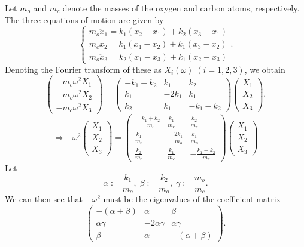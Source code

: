 \item

Let $m_o$ and $m_c$ denote the masses of the oxygen and carbon atoms, respectively.
The three equations of motion are given by
\[
    \begin{cases}
        m_o \ddot{x}_1 = k_1 \left( x_2 - x_1  \right) + k_2 \left( x_3 - x_1  \right) \\
        m_c \ddot{x}_2 = k_1 \left( x_1 - x_2  \right) + k_1 \left( x_3 - x_2  \right) \\
        m_o \ddot{x}_3 = k_2 \left( x_1 - x_3  \right) + k_1\left( x_2 - x_3  \right)
    \end{cases}.
\]
Denoting the Fourier transform of these as $X_i(\omega)\; (i = 1, 2, 3)$, we obtain
\[
    \begin{pmatrix}
        -m_c \omega^2 X_1 \\ -m_o \omega^2 X_2 \\ -m_c \omega^2 X_3
    \end{pmatrix}
    = \begin{pmatrix}
        -k_1 - k_2 & k_1   & k_2        \\
        k_1        & -2k_1 & k_1        \\
        k_2        & k_1   & -k_1 - k_2
    \end{pmatrix} \begin{pmatrix}
        X_1 \\ X_2 \\ X_3
    \end{pmatrix}.
\]
\[
    \Rightarrow -\omega^2 \begin{pmatrix}
        X_1 \\ X_2 \\ X_3
    \end{pmatrix}
    = \begin{pmatrix}
        -\frac{k_1 + k_2}{m_c} & \frac{k_1}{m_c}   & \frac{k_2}{m_c}        \\
        \frac{k_1}{m_o}        & -\frac{2k_1}{m_o} & \frac{k_1}{m_o}        \\
        \frac{k_2}{m_c}        & \frac{k_1}{m_c}   & -\frac{k_1 + k_2}{m_c}
    \end{pmatrix} \begin{pmatrix}
        X_1 \\ X_2 \\ X_3
    \end{pmatrix}
\]
Let
\[
    \alpha := \frac{k_1}{m_o},\;
    \beta := \frac{k_2}{m_o},\;
    \gamma := \frac{m_o}{m_c}.
\]
We can then see that $-\omega^2$ must be the eigenvalues of the coefficient matrix
\[
    \begin{pmatrix}
        -(\alpha + \beta) & \alpha         & \beta             \\
        \alpha\gamma      & -2\alpha\gamma & \alpha\gamma      \\
        \beta             & \alpha         & -(\alpha + \beta)
    \end{pmatrix}.
\]

